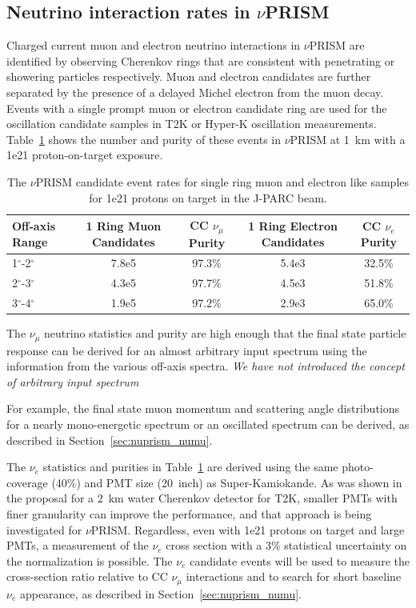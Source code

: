 \subsection{Neutrino interaction rates in $\nu$PRISM}
Charged current muon and electron neutrino interactions in $\nu$PRISM are identified by observing Cherenkov rings that
are consistent with penetrating or showering particles respectively.  Muon and electron candidates are further separated by the
presence of a delayed Michel electron from the muon decay.  Events with a single prompt muon or electron candidate ring are 
used for the oscillation candidate samples in T2K or Hyper-K oscillation measurements.  Table~\ref{tab:events} shows the number
and purity of these events in $\nu$PRISM at 1~km with a 1e21 proton-on-target exposure.

\begin{table}[tbh]
\caption{The $\nu$PRISM candidate event rates for single ring muon and electron like samples for 1e21 protons on target in
the J-PARC beam.}
\label{tab:events}
\begin{tabular}{l|cc|cc}
\hline
Off-axis Range & 1 Ring Muon Candidates & CC $\nu_{\mu}$ Purity & 1 Ring Electron Candidates & CC $\nu_{e}$ Purity \\
\hline
1$^{\circ}$-2$^{\circ}$ & 7.8e5 & 97.3\% & 5.4e3 & 32.5\%\\
2$^{\circ}$-3$^{\circ}$ & 4.3e5 & 97.7\% & 4.5e3 & 51.8\% \\
3$^{\circ}$-4$^{\circ}$ & 1.9e5 & 97.2\% & 2.9e3 & 65.0\% \\
\hline
\end{tabular}
\end{table}

The $\nu_{\mu}$ neutrino statistics and purity are high enough that the final state particle response can be derived for 
an almost arbitrary input spectrum using the information from the various off-axis spectra.  {\color{red} \it We have not introduced the concept of arbitrary input spectrum }

For example, the final state
muon momentum and scattering angle distributions for a nearly mono-energetic spectrum or an oscillated spectrum can 
be derived, as described in Section~\ref{sec:nuprism_numu}.

The $\nu_{e}$ statistics and purities in Table~\ref{tab:events} are derived using the same photo-coverage (40\%) and 
PMT size (20~inch) as Super-Kamiokande.  As was shown in the proposal for a 2~km water Cherenkov detector for T2K, smaller
PMTs with finer granularity can improve the performance, and that approach is being investigated for $\nu$PRISM. 
Regardless,
even with 1e21 protons on target and large PMTs, a measurement of the $\nu_{e}$ cross section with a 3\% statistical uncertainty
on the normalization is possible.  The $\nu_{e}$ candidate events will be used to measure the cross-section ratio relative to 
CC $\nu_{\mu}$ interactions and to search for short baseline $\nu_e$ appearance, as described in Section~\ref{sec:nuprism_numu}.

